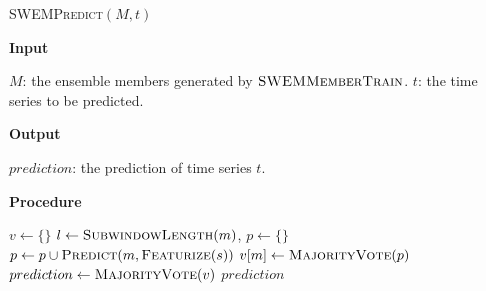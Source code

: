 \documentclass[letterpaper]{article}
\begin{document}

\begin{algorithm}[h]
\caption{\textsc{SWEMPredict}$(M, t)$ }
\label{alg:stacking-predict}
\textbf{Input}%
\begin{algorithmic}[1]
\STATE $M$: the ensemble members generated by $\textsc{SWEMMemberTrain}$. 
\STATE $t$: the time series to be predicted. 
\end{algorithmic}
\textbf{Output}%
\begin{algorithmic}[1]
\STATE $prediction$: the prediction of time series $t$. 
\end{algorithmic}
\textbf{Procedure}%
\begin{algorithmic}[1]
\STATE $v \leftarrow \{\} $
	\STATE $l \leftarrow \textsc{SubwindowLength}(m)$, 
	\STATE $p \leftarrow \{\}$
		\STATE $p \leftarrow p \cup \textsc{Predict}(m, \textsc{Featurize}(s))$
	\ENDFOR
	\STATE $v[m] \leftarrow \textsc{MajorityVote}(p)$
\ENDFOR
\STATE $prediction \leftarrow \textsc{MajorityVote}(v)$
 $prediction$
\end{algorithmic}
\end{algorithm}
\end{document}
